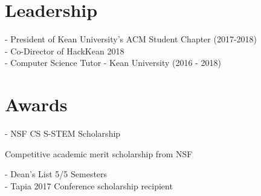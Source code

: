 \documentclass[]{hieudo-build}
\begin{document}
\begin{minipage}[t]{0.34\textwidth}




\section{Leadership}
- President of Kean University's ACM Student Chapter (2017-2018)\\
- Co-Director of HackKean 2018\\
- Computer Science Tutor - Kean University (2016 - 2018)\\
\sectionsep

\section{Awards}
- NSF CS S-STEM Scholarship \\
\vspace{0.9em} %
\begin{tightemize}
\item Competitive academic merit scholarship from NSF
\end{tightemize}
- Dean's List 5/5 Semesters \\
- Tapia 2017 Conference scholarship recipient 
\sectionsep




\sectionsep
\iffalse
\DTMsetdatestyle{mylastupdate}
\DTMdisplaydate{\the\year}{\the\month}{\the\day}{-1}
\fi
\end{minipage} 
\hfill
\end{document}
